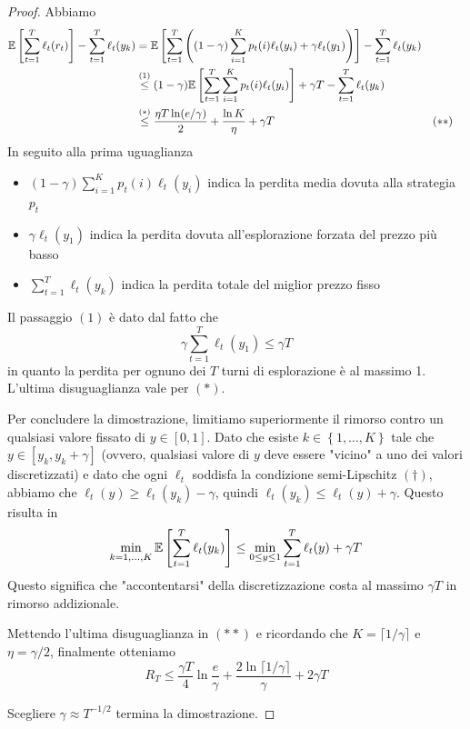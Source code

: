 \begin{proof}
    Abbiamo
    \begin{align*}
        \mathbb{E} \left[\sum_{t = 1}^T \ell_t (r_t) \right] - \sum_{t = 1}^T \ell_t (y_k) & = \mathbb{E} \left[\sum_{t = 1}^T \left( \left(1 - \gamma\right) \sum_{i = 1}^K p_t (i) \ell_t (y_i) + \gamma \ell_t (y_1) \right)\right] - \sum_{t = 1}^T \ell_t (y_k) \\
        & \stackrel{(1)}{\leq} (1 - \gamma) \mathbb{E} \left[\sum_{t = 1}^T \sum_{i = 1}^K p_t (i) \ell_t (y_i) \right] + \gamma T - \sum_{t = 1}^T \ell_t (y_k) \\
        & \stackrel{(\ast)}{\leq} \frac{\eta T \ln (e /\gamma)}{2} + \frac{\ln K}{\eta} + \gamma T && (\ast \ast)
    \end{align*}
   In seguito alla prima uguaglianza
    \begin{itemize}
    	\item $\left(1 - \gamma\right) \sum_{i = 1}^K p_t (i) \ell_t (y_i)$ indica la perdita media dovuta alla strategia $p_t$
    	
    	\item $\gamma \ell_t (y_1)$ indica la perdita dovuta all'esplorazione forzata del prezzo più basso
    	
    	\item $\sum_{t = 1}^T \ell_t (y_k)$ indica la perdita totale del miglior prezzo fisso
    \end{itemize}
    Il passaggio $(1)$ è dato dal fatto che 
    $$ \gamma \sum_{t = 1}^T \ell_t (y_1) \leq \gamma T $$
    in quanto la perdita per ognuno dei $T$ turni di esplorazione è al massimo 1. L'ultima disuguaglianza vale per $(\ast)$. 
    
    Per concludere la dimostrazione, limitiamo superiormente il rimorso contro un qualsiasi valore fissato di $y \in [0,1]$. Dato che esiste $k \in \left\{1, \dots, K\right\}$ tale che $y \in \left[y_k, y_k + \gamma \right]$ (ovvero, qualsiasi valore di $y$ deve essere "vicino" a uno dei valori discretizzati) e dato che ogni $\ell_t$ soddisfa la condizione semi-Lipschitz $(\dag)$, abbiamo che $\ell_t (y) \geq \ell_t (y_k) - \gamma$, quindi $\ell_t (y_k) \leq \ell_t (y) + \gamma$. Questo risulta in
    $$ \min_{k = 1, \dots, K} \mathbb{E} \left[\sum_{t = 1}^T \ell_t (y_k) \right] \leq \min_{0 \leq y \leq 1} \sum_{t = 1}^T \ell_t (y) + \gamma T $$
    Questo significa che "accontentarsi" della discretizzazione costa al massimo $\gamma T$ in rimorso addizionale.
    
    Mettendo l'ultima disuguaglianza in $(\ast \ast)$ e ricordando che $K = \lceil 1 / \gamma \rceil$ e $\eta = \gamma/2$, finalmente otteniamo 
    $$ R_T \leq \frac{\gamma T}{4} \ln \frac{e}{\gamma} + \frac{2\ln \lceil 1 / \gamma \rceil}{\gamma} + 2 \gamma T $$
    
    Scegliere $\gamma \approx T^{-1/2}$ termina la dimostrazione.
\end{proof}

